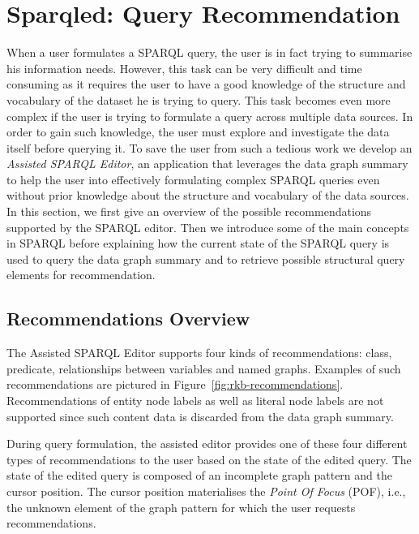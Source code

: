 \section{Sparqled: Query Recommendation}
\label{sec:exploiting:sparqled:recommendation}

When a user formulates a SPARQL query, the user is in fact trying to summarise his information needs. However, this task can be very difficult and time consuming as it requires the user to have a good knowledge of the structure and vocabulary of the dataset he is trying to query. This task becomes even more complex if the user is trying to formulate a query across multiple data sources. In order to gain such knowledge, the user must explore and investigate the data itself before querying it. To save the user from such a tedious work we develop an \emph{Assisted SPARQL Editor}, an application that leverages the data graph summary to help the user into effectively formulating complex SPARQL queries even without prior knowledge about the structure and vocabulary of the data sources. In this section, we first give an overview of the possible recommendations supported by the SPARQL editor. Then we introduce some of the main concepts in SPARQL before explaining how the current state of the SPARQL query is used to query the data graph summary and to retrieve possible structural query elements for recommendation.

\subsection{Recommendations Overview}

The Assisted SPARQL Editor supports four kinds of recommendations: class, predicate, relationships between variables and named graphs. Examples of such recommendations are pictured in Figure~\ref{fig:rkb-recommendations}. Recommendations of entity node labels as well as literal node labels are not supported since such content data is discarded from the data graph summary.

During query formulation, the assisted editor provides one of these four different types of recommendations to the user based on the state of the edited query. The state of the edited query is composed of an incomplete graph pattern and the cursor position. The cursor position materialises the \emph{Point Of Focus} (POF), i.e., the unknown element of the graph pattern for which the user requests recommendations.

